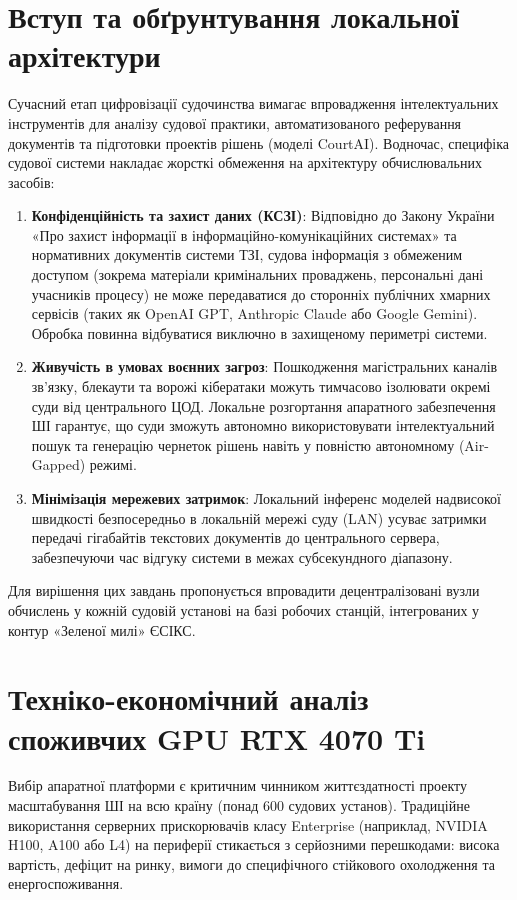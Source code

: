 \documentclass{article}
\begin{document}
\newpage
\section{Вступ та обґрунтування локальної архітектури}
Сучасний етап цифровізації судочинства вимагає впровадження інтелектуальних інструментів для аналізу судової практики, автоматизованого реферування документів та підготовки проектів рішень (моделі CourtAI). Водночас, специфіка судової системи накладає жорсткі обмеження на архітектуру обчислювальних засобів:

\begin{enumerate}
\item \textbf{Конфіденційність та захист даних (КСЗІ)}: Відповідно до Закону України «Про захист інформації в інформаційно-комунікаційних системах» та нормативних документів системи ТЗІ, судова інформація з обмеженим доступом (зокрема матеріали кримінальних проваджень, персональні дані учасників процесу) не може передаватися до сторонніх публічних хмарних сервісів (таких як OpenAI GPT, Anthropic Claude або Google Gemini). Обробка повинна відбуватися виключно в захищеному периметрі системи.
\item \textbf{Живучість в умовах воєнних загроз}: Пошкодження магістральних каналів зв'язку, блекаути та ворожі кібератаки можуть тимчасово ізолювати окремі суди від центрального ЦОД. Локальне розгортання апаратного забезпечення ШІ гарантує, що суди зможуть автономно використовувати інтелектуальний пошук та генерацію чернеток рішень навіть у повністю автономному (Air-Gapped) режимі.
\item \textbf{Мінімізація мережевих затримок}: Локальний інференс моделей надвисокої швидкості безпосередньо в локальній мережі суду (LAN) усуває затримки передачі гігабайтів текстових документів до центрального сервера, забезпечуючи час відгуку системи в межах субсекундного діапазону.
\end{enumerate}

Для вирішення цих завдань пропонується впровадити децентралізовані вузли обчислень у кожній судовій установі на базі робочих станцій, інтегрованих у контур «Зеленої милі» ЄСІКС.

\section{Техніко-економічний аналіз споживчих GPU RTX 4070 Ti}
Вибір апаратної платформи є критичним чинником життєздатності проекту масштабування ШІ на всю країну (понад 600 судових установ). Традиційне використання серверних прискорювачів класу Enterprise (наприклад, NVIDIA H100, A100 або L4) на периферії стикається з серйозними перешкодами: висока вартість, дефіцит на ринку, вимоги до специфічного стійкового охолодження та енергоспоживання.
\end{document}
